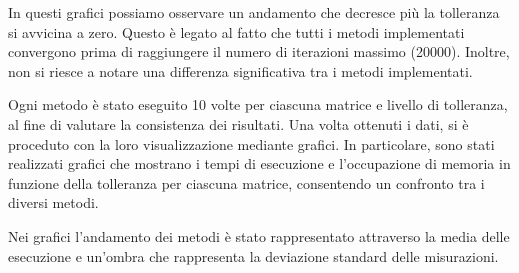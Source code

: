 In questi grafici possiamo osservare un andamento che decresce più la tolleranza
si avvicina a zero. Questo è legato al fatto che tutti i metodi implementati
convergono prima di raggiungere il numero di iterazioni massimo (20000). Inoltre,
non si riesce a notare una differenza significativa tra i metodi implementati.



Ogni metodo è stato eseguito 10 volte per ciascuna matrice e livello di tolleranza,
al fine di valutare la consistenza dei risultati. Una volta ottenuti i dati, si è
proceduto con la loro visualizzazione mediante grafici. In particolare, sono stati
realizzati grafici che mostrano i tempi di esecuzione e l'occupazione di memoria
in funzione della tolleranza per ciascuna matrice, consentendo un confronto tra
i diversi metodi.

Nei grafici l'andamento dei metodi è stato rappresentato attraverso la media delle
esecuzione e un'ombra che rappresenta la deviazione standard delle misurazioni.

